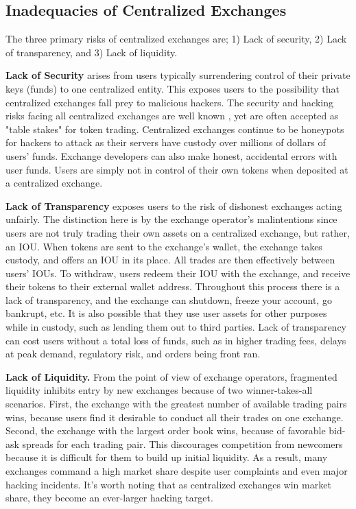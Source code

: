 \documentclass[UTF8,nofonts]{article}
\begin{document}
\begin{multicols}{2}
\subsection{Inadequacies of Centralized Exchanges}
The three primary risks of centralized exchanges are; 1) Lack of security, 2) Lack of transparency, and 3) Lack of liquidity.

\textbf{Lack of Security} arises from users typically surrendering control of their private keys (funds) to one centralized entity. This exposes users to the possibility that centralized exchanges fall prey to malicious hackers. The security and hacking risks facing all centralized exchanges are well known \cite{coincheckhack} \cite{mtgox} \cite{mcmillan2014inside}, yet are often accepted as "table stakes" for token trading. Centralized exchanges continue to be honeypots for hackers to attack as their servers have custody over millions of dollars of users' funds. Exchange developers can also make honest, accidental errors with user funds. Users are simply not in control of their own tokens when deposited at a centralized exchange.

\textbf{Lack of Transparency} exposes users to the risk of dishonest exchanges acting unfairly. The distinction here is by the exchange operator's malintentions since users are not truly trading their own assets on a centralized exchange, but rather, an IOU. When tokens are sent to the exchange's wallet, the exchange takes custody, and offers an IOU in its place. All trades are then effectively between users' IOUs. To withdraw, users redeem their IOU with the exchange, and receive their tokens to their external wallet address. Throughout this process there is a lack of transparency, and the exchange can shutdown, freeze your account, go bankrupt, etc. It is also possible that they use user assets for other purposes while in custody, such as lending them out to third parties. Lack of transparency can cost users without a total loss of funds, such as in higher trading fees, delays at peak demand, regulatory risk, and orders being front ran.

\textbf{Lack of Liquidity.} From the point of view of exchange operators, fragmented liquidity inhibits entry by new exchanges because of two winner-takes-all scenarios. First, the exchange with the greatest number of available trading pairs wins, because users find it desirable to conduct all their trades on one exchange. Second, the exchange with the largest order book wins, because of favorable bid-ask spreads for each trading pair. This discourages competition from newcomers because it is difficult for them to build up initial liquidity. As a result, many exchanges command a high market share despite user complaints and even major hacking incidents. It's worth noting that as centralized exchanges win market share, they become an ever-larger hacking target. 


\end{multicols}
\end{document}
